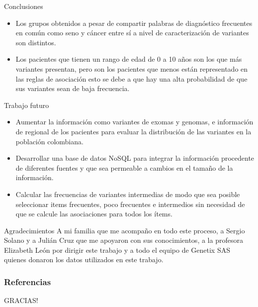 \documentclass[xcolor=dvipsnames]{beamer}
\begin{document}
\begin{frame}{Conclusiones}
 
 \begin{itemize}
    \justifying
 \item Los grupos obtenidos a pesar de compartir palabras de diagnóstico frecuentes en común como seno y cáncer entre sí a nivel de caracterización de variantes son distintos.
	\item Los pacientes que tienen un rango de edad de 0 a 10 años son los que más variantes presentan, pero son los pacientes que menos están representado en las reglas de asociación esto se debe a que hay una alta probabilidad de que sus variantes sean de baja frecuencia.
\end{itemize}
\end{frame}
\begin{frame}{Trabajo futuro}
\justifying 
 \begin{itemize}
 \justifying 

	\item Aumentar la información  como variantes de exomas y genomas, e información de regional de los pacientes para evaluar la distribución de las variantes en la población colombiana.

	\item Desarrollar una base de datos NoSQL para integrar la información procedente de diferentes fuentes y que sea permeable a cambios en el tamaño de la información.
	
	\item Calcular las frecuencias de variantes intermedias de modo que sea posible seleccionar items frecuentes, poco frecuentes e intermedios sin necesidad de que se calcule las asociaciones para todos los ítems. 

\end{itemize}
\end{frame}

\begin{frame}{Agradecimientos}
 \justifying 
    A mi familia que me acompaño en todo este proceso, a Sergio Solano y a Julián Cruz que me apoyaron con sus conocimientos, a la profesora Elizabeth León por dirigir este trabajo y a todo el equipo de Genetix SAS quienes donaron los datos utilizados en este trabajo.
\end{frame}


\renewcommand{\addcontentsline}[3]{}%
\renewcommand{\section}[2]{}%

\begin{frame}[allowframebreaks]
	\frametitle{Referencias}
	
		
\end{frame}

\begin{frame}{}
  \centering \Large
	{\fontsize{40}{50}\selectfont GRACIAS!}
\end{frame}
\end{document}
